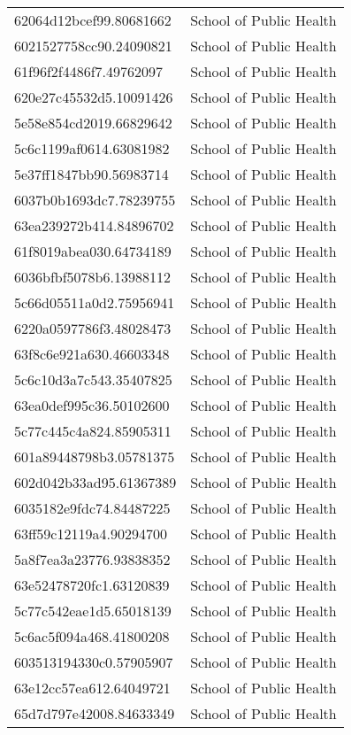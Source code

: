 \begin{tabular}{ll}
62064d12bcef99.80681662 & School of Public Health \\
6021527758cc90.24090821 & School of Public Health \\
61f96f2f4486f7.49762097 & School of Public Health \\
620e27c45532d5.10091426 & School of Public Health \\
5e58e854cd2019.66829642 & School of Public Health \\
5c6c1199af0614.63081982 & School of Public Health \\
5e37ff1847bb90.56983714 & School of Public Health \\
6037b0b1693dc7.78239755 & School of Public Health \\
63ea239272b414.84896702 & School of Public Health \\
61f8019abea030.64734189 & School of Public Health \\
6036bfbf5078b6.13988112 & School of Public Health \\
5c66d05511a0d2.75956941 & School of Public Health \\
6220a0597786f3.48028473 & School of Public Health \\
63f8c6e921a630.46603348 & School of Public Health \\
5c6c10d3a7c543.35407825 & School of Public Health \\
63ea0def995c36.50102600 & School of Public Health \\
5c77c445c4a824.85905311 & School of Public Health \\
601a89448798b3.05781375 & School of Public Health \\
602d042b33ad95.61367389 & School of Public Health \\
6035182e9fdc74.84487225 & School of Public Health \\
63ff59c12119a4.90294700 & School of Public Health \\
5a8f7ea3a23776.93838352 & School of Public Health \\
63e52478720fc1.63120839 & School of Public Health \\
5c77c542eae1d5.65018139 & School of Public Health \\
5c6ac5f094a468.41800208 & School of Public Health \\
603513194330c0.57905907 & School of Public Health \\
63e12cc57ea612.64049721 & School of Public Health \\
65d7d797e42008.84633349 & School of Public Health \\

\end{tabular}
